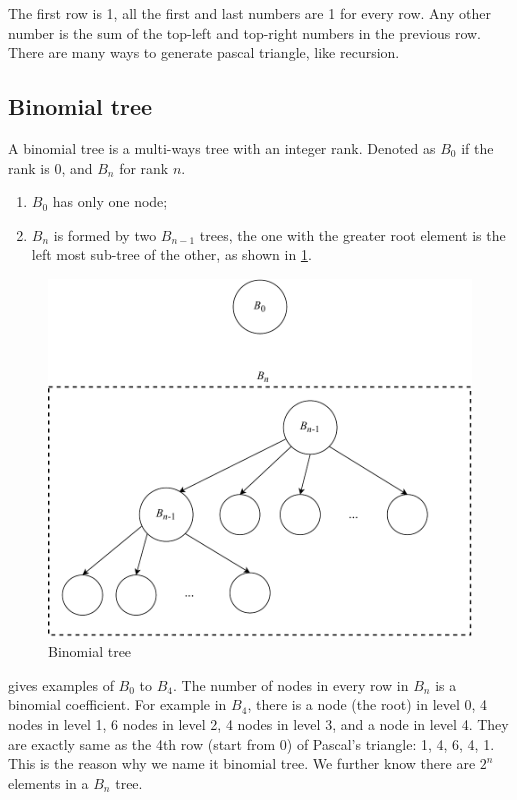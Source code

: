 \documentclass[b5paper]{article}
\begin{document}
The first row is 1, all the first and last numbers are 1 for every row. Any other number is the sum of the top-left and top-right numbers in the previous row. There are many ways to generate pascal triangle, like recursion.

\subsection{Binomial tree}
\label{Binomial tree} 

A binomial tree is a multi-ways tree with an integer rank. Denoted as $B_0$ if the rank is 0, and $B_n$ for rank $n$.

\begin{enumerate}
\item $B_0$ has only one node;
\item $B_n$ is formed by two $B_{n-1}$ trees, the one with the greater root element is the left most sub-tree of the other, as shown in \cref{fig:link-bitree}.
\end{enumerate}

\begin{figure}[htbp]
  \centering
  \includegraphics[scale=0.5]{img/binomial-tree}
  \caption{Binomial tree}
  \label{fig:link-bitree}
\end{figure}

 gives examples of $B_0$ to $B_4$. The number of nodes in every row in $B_n$ is a binomial coefficient. For example in $B_4$, there is a node (the root) in level 0, 4 nodes in level 1, 6 nodes in level 2, 4 nodes in level 3, and a node in level 4. They are exactly same as the 4th row (start from 0) of Pascal's triangle: 1, 4, 6, 4, 1. This is the reason why we name it binomial tree. We further know there are $2^n$ elements in a $B_n$ tree.
\end{document}
